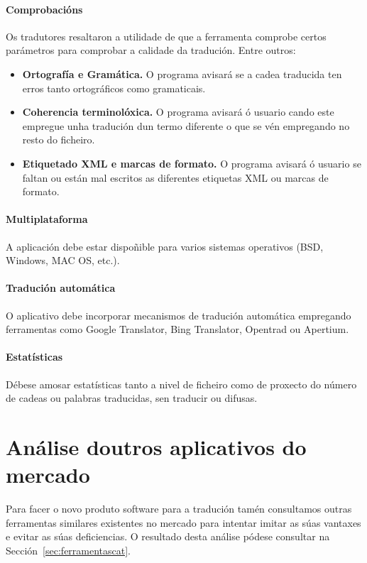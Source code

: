 	\paragraph{Comprobacións} Os tradutores resaltaron a utilidade de que a ferramenta comprobe certos parámetros para comprobar a calidade da tradución. Entre outros:
		\begin{itemize}
			\item \textbf{Ortografía e Gramática.} O programa avisará se a cadea traducida ten erros tanto ortográficos como gramaticais.
			\item \textbf{Coherencia terminolóxica.} O programa avisará ó usuario cando este empregue unha tradución dun termo diferente o que se vén empregando no resto do ficheiro.
			\item \textbf{Etiquetado XML e marcas de formato.} O programa avisará ó usuario se faltan ou están mal escritos as diferentes etiquetas XML ou marcas de formato.
		\end{itemize}

	\paragraph{Multiplataforma} A aplicación debe estar dispoñible para varios sistemas operativos (BSD, Windows, MAC OS, etc.).

	\paragraph{Tradución automática} O aplicativo debe incorporar mecanismos de tradución automática empregando ferramentas como Google Translator, Bing Translator, Opentrad ou Apertium.

	\paragraph{Estatísticas} Débese amosar estatísticas tanto a nivel de ficheiro como de proxecto do número de cadeas ou palabras traducidas, sen traducir ou difusas.

\section{Análise doutros aplicativos do mercado}
Para facer o novo produto software para a tradución tamén consultamos outras ferramentas similares existentes no mercado para intentar imitar as súas vantaxes e evitar as súas deficiencias. O resultado desta análise pódese consultar na Sección~\ref{sec:ferramentascat}.

